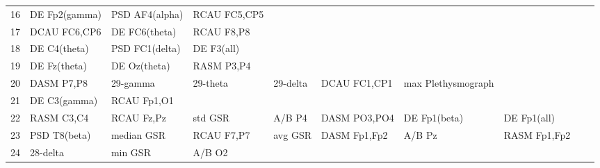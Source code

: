 \begin{landscape}
\begin{table}[]
\begin{tabular}{l|llllllll}
16       & DE Fp2(gamma)         & PSD AF4(alpha)        & RCAU FC5,CP5         &                         &                         &                      &                      &                       &                       &                    \\
17       & DCAU FC6,CP6          & DE FC6(theta)         & RCAU F8,P8           &                         &                         &                      &                      &                       &                       &                    \\
18       & DE C4(theta)          & PSD FC1(delta)        & DE F3(all)           &                         &                         &                      &                      &                       &                       &                    \\
19       & DE Fz(theta)          & DE Oz(theta)          & RASM P3,P4           &                         &                         &                      &                      &                       &                       &                    \\
20       & DASM P7,P8            & 29-gamma              & 29-theta             & 29-delta                & DCAU FC1,CP1            & max Plethysmograph   &                      &                       &                       &                    \\
21       & DE C3(gamma)          & RCAU Fp1,O1           &                      &                         &                         &                      &                      &                       &                       &                    \\
22       & RASM C3,C4            & RCAU Fz,Pz            & std GSR              & A/B P4                  & DASM PO3,PO4            & DE Fp1(beta)         & DE Fp1(all)          &                       &                       &                    \\
23       & PSD T8(beta)          & median GSR            & RCAU F7,P7           & avg GSR                 & DASM Fp1,Fp2            & A/B Pz               & RASM Fp1,Fp2         &                       &                       &                    \\
24       & 28-delta              & min GSR               & A/B O2               &                         &                         &                      &                      &                       &                       &                    \\

\end{tabular}
\end{table}
\end{landscape}
